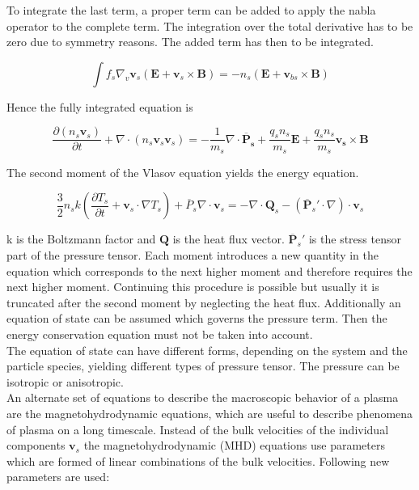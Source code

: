 \documentclass[a4paper,11pt]{thesis}
\begin{document}
To integrate the last term, a proper term can be added to apply the nabla operator to the complete term. The integration over the total derivative has to be zero due to symmetry reasons. The added term has then to be integrated.

\begin{equation}
\int f_s \nabla_v \mathbf{v}_s (\mathbf{E}+\mathbf{v}_s\times
\mathbf{B})=-n_s (\mathbf{E}+\mathbf{v}_{bs}\times
\mathbf{B})
\end{equation}

Hence the fully integrated equation is

\begin{equation}\label{momentum_equation}
     \frac{\partial (n_s \mathbf{v}_s)}{\partial t}+ \nabla \cdot
     (n_s \mathbf{v}_s  \mathbf{v}_s) = -\frac{1}{m_s}\nabla \cdot
     \mathbf{\overline{P}_s} + \frac{q_s n_s}{m_s} \mathbf{E}+\frac{q_s n_s}
     {m_s}\mathbf{v_s}\times \mathbf{B}
\end{equation}

The second moment of the
Vlasov equation yields the energy equation.

\begin{equation}\label{energy_equ}
    \frac{3}{2}n_s k\left( \frac{\partial T_s}{\partial t} + \mathbf{v}_s \cdot \nabla T_s \right) + \overline{P}_s
    \nabla \cdot \mathbf{v}_s=-\nabla \cdot \mathbf{Q}_s- (\overline{\mathbf{P}}_s'\cdot \nabla) \cdot \mathbf{v}_s
\end{equation}

k is the Boltzmann factor and $\mathbf{Q}$ is the heat flux vector.
$\overline{\mathbf{P}}_s'$ is the stress tensor part of the pressure tensor.
Each moment introduces a new quantity in the equation which
corresponds to the next higher moment and therefore requires the
next higher moment. Continuing this procedure is possible but
usually it is truncated after the second moment by neglecting the
heat flux. Additionally an equation of state can be assumed which
governs the pressure term. Then the energy conservation equation
must not be taken into account.\\

The equation of state can have different forms, depending on the
system and the particle species, yielding different types of
pressure tensor. The pressure can be isotropic or anisotropic.\\

An alternate set of equations to describe the macroscopic behavior
of a plasma are the magnetohydrodynamic equations, which are useful
to describe phenomena of plasma on a long timescale. Instead of the
bulk velocities of the individual components $\mathbf{v}_s$ the
magnetohydrodynamic (MHD) equations use parameters which are formed
of linear combinations of the bulk velocities. Following new
parameters are used:
\end{document}
